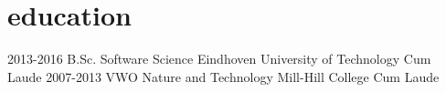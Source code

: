 \documentclass[]{friggeri-cv}
\begin{document}
\section{education}
\begin{entrylist}
  \entry
    {2013-2016}
    {B.Sc. Software Science}
    {Eindhoven University of Technology}
    {Cum Laude}
  \entry
    {2007-2013}
    {VWO Nature and Technology}
    {Mill-Hill College}
    {Cum Laude}
\end{entrylist}
\end{document}
